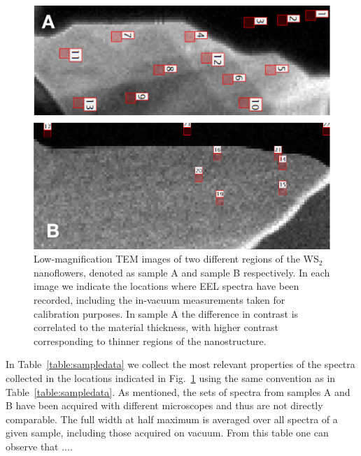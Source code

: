 \begin{figure}[t]
\begin{centering}
  \includegraphics[width=0.87\linewidth]{plots/Spectra_location.pdf}
  \caption{Low-magnification TEM images of two different regions of
    the WS$_2$ nanoflowers, denoted as sample A and sample B respectively.
    In each image we indicate the locations where
    EEL spectra have been recorded, including the in-vacuum measurements taken
    for calibration purposes.
    In sample A the difference in contrast is correlated to the material
    thickness, with higher contrast corresponding to thinner regions of the nanostructure.
  }
\label{fig:ws2positions}
\end{centering}
\end{figure}

In Table~\ref{table:sampledata} we collect the most relevant properties of the spectra collected
in the locations indicated in Fig.~\ref{fig:ws2positions} using the same convention as
in Table~\ref{table:sampledata}.
%
As mentioned, the sets of spectra from samples A and B
have been acquired with different microscopes and thus are
not directly comparable.
%
The full width at half maximum is averaged over all spectra of a given sample,
including those acquired on vacuum.
%
From this table one can observe that ....

